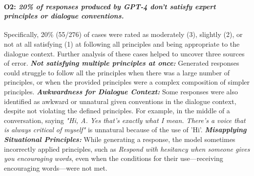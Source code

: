 \documentclass[11pt]{article}
\newcommand{\ryan}[1]{\ifthenelse{\boolean{showcomments}}{\textcolor{orange}{[#1 —ryan]}}{}}
\begin{document}
\paragraph{O2: \textit{20\% of responses produced by GPT-4 don't satisfy expert principles or dialogue conventions.}} \label{sec:pilot-o2}
Specifically, 20\% (55/276) of cases were rated as moderately (3), slightly (2), or not at all satisfying (1) at following all principles and being appropriate to the dialogue context. Further analysis of these cases helped to uncover three sources of error.
 \textit{\textbf{Not satisfying multiple principles at once:}} Generated responses could struggle to follow all the principles when there was a large number of principles, or when the provided principles were a complex composition of simpler principles. 
 \textit{\textbf{Awkwardness for Dialogue Context:}} Some responses were also identified as awkward or unnatural given conventions in the dialogue context,  despite not violating the defined principles. For example, in the middle of a conversation, saying
\textit{"Hi, A. Yes that's exactly what I mean. There's a voice that is always critical of myself"} is unnatural because of the use of 'Hi'.
\textit{\textbf{Misapplying Situational Principles:}} While generating a response, the model sometimes incorrectly applied principles, such as \textit{Respond with hesitancy when someone gives you encouraging words}, even when the conditions for their use—receiving encouraging words—were not met.
\end{document}
